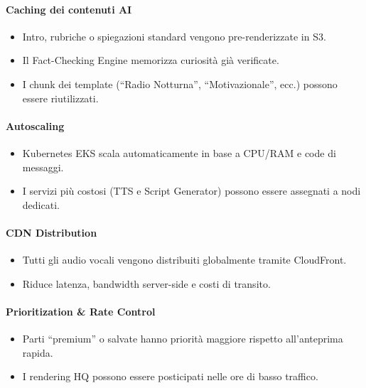 \documentclass[11pt,a4paper]{article}
\begin{document}
\paragraph{Caching dei contenuti AI}
\begin{itemize}
    \item Intro, rubriche o spiegazioni standard vengono pre-renderizzate in S3.
    \item Il Fact-Checking Engine memorizza curiosità già verificate.
    \item I chunk dei template (“Radio Notturna”, “Motivazionale”, ecc.) possono essere riutilizzati.
\end{itemize}

\paragraph{Autoscaling}
\begin{itemize}
    \item Kubernetes EKS scala automaticamente in base a CPU/RAM e code di messaggi.
    \item I servizi più costosi (TTS e Script Generator) possono essere assegnati a nodi dedicati.
\end{itemize}

\paragraph{CDN Distribution}
\begin{itemize}
    \item Tutti gli audio vocali vengono distribuiti globalmente tramite CloudFront.
    \item Riduce latenza, bandwidth server-side e costi di transito.
\end{itemize}

\paragraph{Prioritization \& Rate Control}
\begin{itemize}
    \item Parti “premium” o salvate hanno priorità maggiore rispetto all’anteprima rapida.
    \item I rendering HQ possono essere posticipati nelle ore di basso traffico.
\end{itemize}

\end{document}
